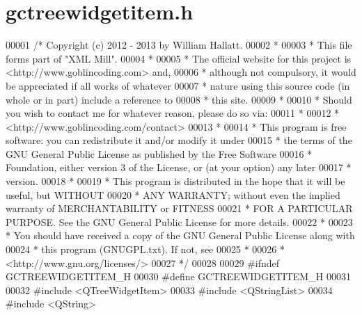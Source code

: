 \hypertarget{gctreewidgetitem_8h_source}{\section{gctreewidgetitem.\-h}
}

\begin{DoxyCode}
00001 \textcolor{comment}{/* Copyright (c) 2012 - 2013 by William Hallatt.}
00002 \textcolor{comment}{ *}
00003 \textcolor{comment}{ * This file forms part of "XML Mill".}
00004 \textcolor{comment}{ *}
00005 \textcolor{comment}{ * The official website for this project is <http://www.goblincoding.com> and,}
00006 \textcolor{comment}{ * although not compulsory, it would be appreciated if all works of whatever}
00007 \textcolor{comment}{ * nature using this source code (in whole or in part) include a reference to}
00008 \textcolor{comment}{ * this site.}
00009 \textcolor{comment}{ *}
00010 \textcolor{comment}{ * Should you wish to contact me for whatever reason, please do so via:}
00011 \textcolor{comment}{ *}
00012 \textcolor{comment}{ *                 <http://www.goblincoding.com/contact>}
00013 \textcolor{comment}{ *}
00014 \textcolor{comment}{ * This program is free software: you can redistribute it and/or modify it
       under}
00015 \textcolor{comment}{ * the terms of the GNU General Public License as published by the Free
       Software}
00016 \textcolor{comment}{ * Foundation, either version 3 of the License, or (at your option) any later}
00017 \textcolor{comment}{ * version.}
00018 \textcolor{comment}{ *}
00019 \textcolor{comment}{ * This program is distributed in the hope that it will be useful, but WITHOUT}
00020 \textcolor{comment}{ * ANY WARRANTY; without even the implied warranty of MERCHANTABILITY or
       FITNESS}
00021 \textcolor{comment}{ * FOR A PARTICULAR PURPOSE.  See the GNU General Public License for more
       details.}
00022 \textcolor{comment}{ *}
00023 \textcolor{comment}{ * You should have received a copy of the GNU General Public License along with}
00024 \textcolor{comment}{ * this program (GNUGPL.txt).  If not, see}
00025 \textcolor{comment}{ *}
00026 \textcolor{comment}{ *                    <http://www.gnu.org/licenses/>}
00027 \textcolor{comment}{ */}
00028 
00029 \textcolor{preprocessor}{#ifndef GCTREEWIDGETITEM\_H}
00030 \textcolor{preprocessor}{}\textcolor{preprocessor}{#define GCTREEWIDGETITEM\_H}
00031 \textcolor{preprocessor}{}
00032 \textcolor{preprocessor}{#include <QTreeWidgetItem>}
00033 \textcolor{preprocessor}{#include <QStringList>}
00034 \textcolor{preprocessor}{#include <QString>}

\end{DoxyCode}
